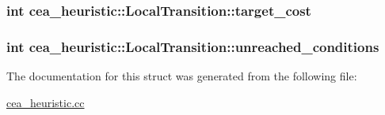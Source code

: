 \hypertarget{structcea__heuristic_1_1LocalTransition_aeb7ee7a8f8eb15bf991fa0a15da7df47}{
\subsubsection[{target\-\_\-cost}]{\setlength{\rightskip}{0pt plus 5cm}int cea\-\_\-heuristic\-::\-Local\-Transition\-::target\-\_\-cost}}\label{structcea__heuristic_1_1LocalTransition_aeb7ee7a8f8eb15bf991fa0a15da7df47}
\hypertarget{structcea__heuristic_1_1LocalTransition_a1cfc683bfa5c7fd391edfdc4da647e83}{
\subsubsection[{unreached\-\_\-conditions}]{\setlength{\rightskip}{0pt plus 5cm}int cea\-\_\-heuristic\-::\-Local\-Transition\-::unreached\-\_\-conditions}}\label{structcea__heuristic_1_1LocalTransition_a1cfc683bfa5c7fd391edfdc4da647e83}


The documentation for this struct was generated from the following file\-:\begin{DoxyCompactItemize}
\item 
\hyperlink{cea__heuristic_8cc}{cea\-\_\-heuristic.\-cc}\end{DoxyCompactItemize}
